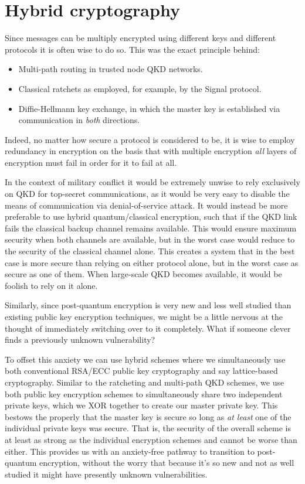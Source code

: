 \section{Hybrid cryptography} \label{hybrid-cryptography}

Since messages can be multiply encrypted using different keys and different protocols it is often wise to do so. This was the exact principle behind:
\begin{itemize}
	\item Multi-path routing in trusted node QKD networks.
	\item Classical ratchets as employed, for example, by the Signal protocol.
	\item Diffie-Hellmann key exchange, in which the master key is established via communication in \emph{both} directions.
\end{itemize}
Indeed, no matter how secure a protocol is considered to be, it is wise to employ redundancy in encryption on the basis that with multiple encryption \emph{all} layers of encryption must fail in order for it to fail at all.

In the context of military conflict it would be extremely unwise to rely exclusively on QKD for top-secret communications, as it would be very easy to disable the means of communication via denial-of-service attack. It would instead be more preferable to use hybrid quantum/classical encryption, such that if the QKD link fails the classical backup channel remains available. This would ensure maximum security when both channels are available, but in the worst case would reduce to the security of the classical channel alone. This creates a system that in the best case is more secure than relying on either protocol alone, but in the worst case as secure as one of them. When large-scale QKD becomes available, it would be foolish to rely on it alone.

Similarly, since post-quantum encryption is very new and less well studied than existing public key encryption techniques, we might be a little nervous at the thought of immediately switching over to it completely. What if someone clever finds a previously unknown vulnerability?

To offset this anxiety we can use hybrid schemes where we simultaneously use both conventional RSA/ECC public key cryptography and say lattice-based cryptography. Similar to the ratcheting and multi-path QKD schemes, we use both public key encryption schemes to simultaneously share two independent private keys, which we XOR together to create our master private key. This bestows the properly that the master key is secure so long as \emph{at least} one of the individual private keys was secure. That is, the security of the overall scheme is at least as strong as the individual encryption schemes and cannot be worse than either. This provides us with an anxiety-free pathway to transition to post-quantum encryption, without the worry that because it's so new and not as well studied it might have presently unknown vulnerabilities.

